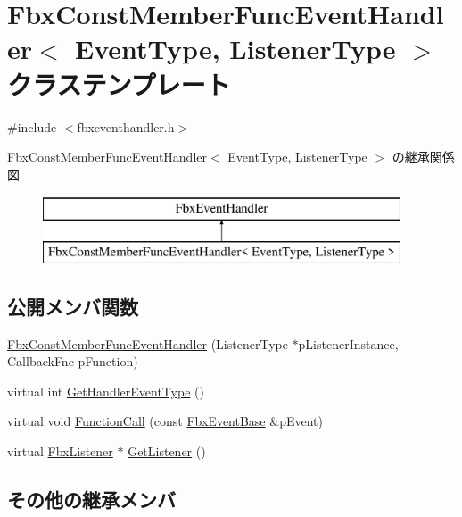 \hypertarget{class_fbx_const_member_func_event_handler}{}\section{Fbx\+Const\+Member\+Func\+Event\+Handler$<$ Event\+Type, Listener\+Type $>$ クラステンプレート}
\label{class_fbx_const_member_func_event_handler}


{\ttfamily \#include $<$fbxeventhandler.\+h$>$}

Fbx\+Const\+Member\+Func\+Event\+Handler$<$ Event\+Type, Listener\+Type $>$ の継承関係図\begin{figure}[H]
\begin{center}
\leavevmode
\includegraphics[height=2.000000cm]{class_fbx_const_member_func_event_handler}
\end{center}
\end{figure}
\subsection*{公開メンバ関数}
\begin{DoxyCompactItemize}
\item 
\hyperlink{class_fbx_const_member_func_event_handler_ae3bd1e1775d0126faa06efe6ffda1211}{Fbx\+Const\+Member\+Func\+Event\+Handler} (Listener\+Type $\ast$p\+Listener\+Instance, Callback\+Fnc p\+Function)
\item 
virtual int \hyperlink{class_fbx_const_member_func_event_handler_ac88157f51fa72cba959f31dfbcdee4a5}{Get\+Handler\+Event\+Type} ()
\item 
virtual void \hyperlink{class_fbx_const_member_func_event_handler_ae6c6805404e8045de40289893709dc54}{Function\+Call} (const \hyperlink{class_fbx_event_base}{Fbx\+Event\+Base} \&p\+Event)
\item 
virtual \hyperlink{class_fbx_listener}{Fbx\+Listener} $\ast$ \hyperlink{class_fbx_const_member_func_event_handler_a9e370edd4a746ef5098d39a4f9c3d63c}{Get\+Listener} ()
\end{DoxyCompactItemize}
\subsection*{その他の継承メンバ}


